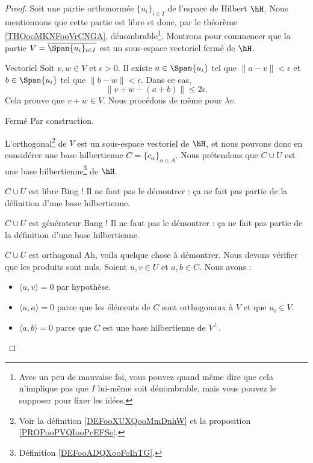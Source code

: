 \begin{proof}
    Soit une partie orthonormée \( \{ u_i \}_{i\in I}\) de l'espace de Hilbert \( \hH\). Nous mentionnons que cette partie est libre et donc, par le théorème \ref{THOooMKNFooVrCNGA}, dénombrable\footnote{Avec un peu de mauvaise foi, vous pouvez quand même dire que cela n'implique pas que \( I\) lui-même soit dénombrable, mais vous pouvez le supposer pour fixer les idées.}.  Montrons pour commencer que la partie \( V=\overline{\Span\{ u_i \}_{i\in I}}\) est un sous-espace vectoriel fermé de \( \hH\).
    \begin{subproof}
        \item[Vectoriel] Soit \( v,w\in V\) et \( \epsilon>0\). Il existe \( a\in \Span\{ u_i \}\) tel que \( \| a-v \|<\epsilon\) et \( b\in \Span\{ u_i \}\) tel que \( \| b-w \|<\epsilon\). Dans ce cas,
            \begin{equation}
                \| v+w-(a+b) \|\leq 2\epsilon.
            \end{equation}
            Cela prouve que \( v+w\in V\). Nous procédons de même pour \( \lambda v\).
        \item[Fermé] Par construction.
    \end{subproof}

    L'orthogonal\footnote{Voir la définition \ref{DEFooXUXQooMmDnhW} et la proposition \ref{PROPooPVQIooPcEFSe}.} de \( V\) est un sous-espace vectoriel de \( \hH\), et nous pouvons donc en considérer une base hilbertienne \( C=\{ c_{\alpha} \}_{\alpha\in A}\). Nous prétendons que \( C\cup U\) est une base hilbertienne\footnote{Définition \ref{DEFooADQXooFoIhTG}.} de \( \hH\).
    \begin{subproof}
        \item[\( C\cup U\) est libre]
            Bing ! Il ne faut pas le démontrer : ça ne fait pas partie de la définition d'une base hilbertienne.
        \item[\( C\cup U\) est générateur]
            Bang ! Il ne faut pas le démontrer : ça ne fait pas partie de la définition d'une base hilbertienne.
        \item[\( C\cup U\) est orthogonal]
            Ah, voila quelque chose à démontrer. Nous devons vérifier que les produits sont nuls. Soient \( u,v\in U\) et \( a,b\in C\). Nous avons :
            \begin{itemize}
                \item \( \langle u, v\rangle =0\) par hypothèse.
                \item \( \langle u, a\rangle =0\) parce que les éléments de \( C\) sont orthogonaux à \( V\) et que \( u_i\in V\).
                \item \( \langle a, b\rangle =0\) parce que \( C\) est une base hilbertienne de \( V^{\perp}\).
            \end{itemize}


\end{subproof}
\end{proof}
